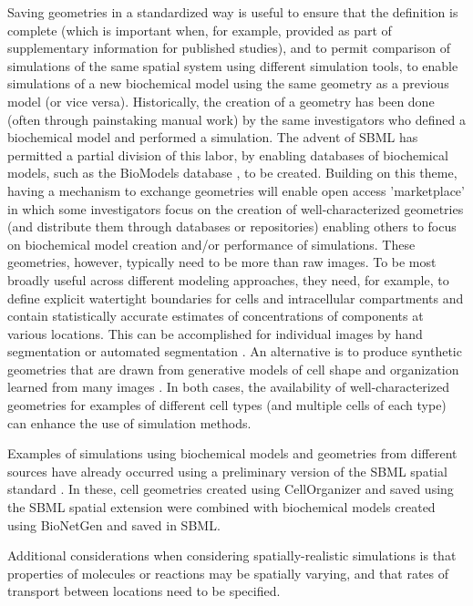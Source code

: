 Saving geometries in a standardized way is useful to ensure that the definition is complete (which is important when, for example, provided as part of supplementary information for published studies), and to permit comparison of simulations of the same spatial system using different simulation tools, to enable simulations of a new biochemical model using the same geometry as a previous model (or vice versa). Historically, the creation of a geometry has been done (often through painstaking manual work) by the same investigators who defined a biochemical model and performed a simulation. The advent of SBML has permitted a partial division of this labor, by enabling databases of biochemical models, such as the BioModels database \citep{lenovere:2006, li:2010}, to be created. Building on this theme, having a mechanism to exchange geometries will enable  open access 'marketplace' in which some investigators focus on the creation of well-characterized geometries (and distribute them through databases or repositories) enabling others to focus on biochemical model creation and/or performance of simulations. These geometries, however, typically need to be more than raw images. To be most broadly useful across different modeling approaches, they need, for example, to define explicit watertight boundaries for cells and intracellular compartments and contain statistically accurate estimates of concentrations of components at various locations. This can be accomplished for individual images by hand segmentation \citep{loew:2001} or automated segmentation \citep{perez:2014}. An alternative is to produce synthetic geometries that are drawn from generative models of cell shape and organization learned from many images \citep{zhao:2007}. In both cases, the availability of well-characterized geometries for examples of different cell types (and multiple cells of each type) can enhance the use of simulation methods.

Examples of simulations using biochemical models and geometries from different sources have already occurred using a preliminary version of the SBML spatial standard \citep{sullivan:2015, donovan:2016}. In these, cell geometries created using CellOrganizer and saved using the SBML spatial extension were combined with biochemical models created using BioNetGen and saved in SBML.

Additional considerations when considering spatially-realistic simulations is that properties of molecules or reactions may be spatially varying, and that rates of transport between locations need to be specified.


